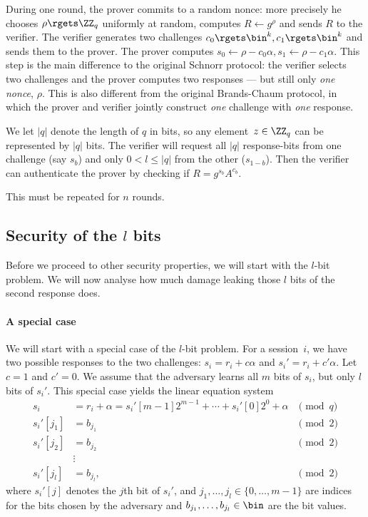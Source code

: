 During one round, the prover commits to a random nonce: more precisely he 
chooses \(
  \rho\rgets \ZZ_q
\) uniformly at random, computes \(
  R\gets g^\rho
\) and sends \(R\) to the verifier.
The verifier generates two challenges \(
  c_0\rgets \bin^k,
  c_1\rgets \bin^k
\) and sends them to the prover.
The prover computes \(
  s_0\gets \rho - c_0\alpha,
  s_1\gets \rho - c_1\alpha.
\)
This step is the main difference to the original Schnorr protocol: the verifier selects two challenges and the prover computes two responses --- but still only \emph{one nonce}, \(\rho\).
This is also different from the original Brands-Chaum protocol, in which the 
prover and verifier jointly construct \emph{one} challenge with \emph{one} 
response.

We let \(|q|\) denote the length of \(q\) in bits, so any element~\(z\in 
\ZZ_q\) can be represented by \(|q|\) bits.
The verifier will request all \(|q|\) response-bits from one challenge (say 
\(s_b\)) and only \(0 < l\leq |q|\) from the other (\(s_{1-b}\)).
Then the verifier can authenticate the prover by checking if \(
  R = g^{s_b}A^{c_b}.
\)

This must be repeated for \(n\) rounds.


\subsection{Security of the \(l\) bits}

Before we proceed to other security properties, we will start with the 
\(l\)-bit problem.
We will now analyse how much damage leaking those \(l\) bits of the second 
response does.

\paragraph*{A special case}

We will start with a special case of the \(l\)-bit problem.
For a session~\(i\), we have two possible responses to the two challenges:
\(s_i = r_i + c\alpha\) and \(s_i' = r_i + c'\alpha\).
Let \(c = 1\) and \(c' = 0\).
We assume that the adversary learns all \(m\) bits of \(s_i\), but only \(l\) 
bits of \(s_i'\).
This special case yields the linear equation system
\begin{align*}
  s_i &= r_i + \alpha
  = s_i'[m-1] 2^{m-1} + \dotsb + s_i'[0] 2^0 + \alpha &\pmod q\\
  s_i'[j_1] &= b_{j_1} &\pmod 2\\
  s_i'[j_2] &= b_{j_2} &\pmod 2\\
            &\vdots \\
  s_i'[j_l] &= b_{j_l}, &\pmod 2
\end{align*}
where \(s_i'[j]\) denotes the \(j\)th bit of \(s_i'\), and \(j_1, \dotsc, 
j_l\in \{0, \dotsc, m-1\}\) are indices for the bits chosen by the adversary 
and \(b_{j_1}, \dotsc, b_{j_l}\in \bin\) are the bit values.

